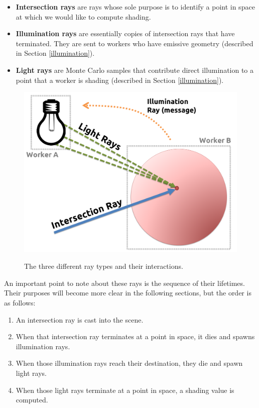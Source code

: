 \documentclass[12pt]{ucthesis}
\newcommand{\captionfonts}{\small\bf\ssp}
\begin{document}
\begin{itemize}
   \item \textbf{Intersection rays} are rays whose sole purpose is to identify
      a point in space at which we would like to compute shading.
   \item \textbf{Illumination rays} are essentially copies of intersection
      rays that have terminated. They are sent to workers who have emissive
      geometry (described in Section \ref{illumination}).
   \item \textbf{Light rays} are Monte Carlo samples that contribute direct
      illumination to a point that a worker is shading (described in Section
      \ref{illumination}).
\end{itemize}

\begin{figure}[h!]
    \centering
    \includegraphics[width=120mm]{figures/raytypes.png}
    \captionfonts
    \caption{The three different ray types and their interactions.}
    \label{fig:raytypes}
\end{figure}

An important point to note about these rays is the sequence of their lifetimes.
Their purposes will become more clear in the following sections, but the order
is as follows:

\begin{enumerate}
   \item An intersection ray is cast into the scene.
   \item When that intersection ray terminates at a point in space, it dies and
      spawns illumination rays.
   \item When those illumination rays reach their destination, they die and
      spawn light rays.
   \item When those light rays terminate at a point in space, a shading value
      is computed.
\end{enumerate}
\end{document}
